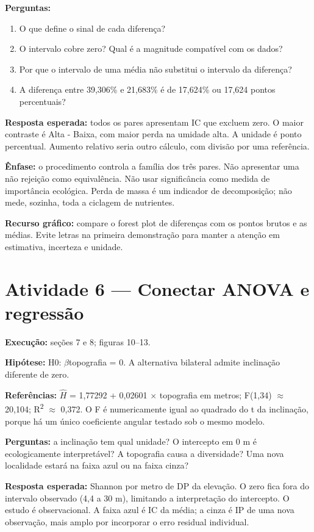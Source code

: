 \textbf{Perguntas:}

\begin{enumerate}
\item O que define o sinal de cada diferença?
\item O intervalo cobre zero? Qual é a magnitude compatível com os dados?
\item Por que o intervalo de uma média não substitui o intervalo da diferença?
\item A diferença entre 39,306\% e 21,683\% é de 17,624\% ou 17,624 pontos percentuais?
\end{enumerate}

\textbf{Resposta esperada:} todos os pares apresentam IC que excluem zero. O maior contraste é Alta - Baixa, com maior perda na umidade alta. A unidade é ponto percentual. Aumento relativo seria outro cálculo, com divisão por uma referência.

\textbf{Ênfase:} o procedimento controla a família dos três pares. Não apresentar uma não rejeição como equivalência. Não usar significância como medida de importância ecológica. Perda de massa é um indicador de decomposição; não mede, sozinha, toda a ciclagem de nutrientes.

\textbf{Recurso gráfico:} compare o forest plot de diferenças com os pontos brutos e as médias. Evite letras na primeira demonstração para manter a atenção em estimativa, incerteza e unidade.

\section{Atividade 6 --- Conectar ANOVA e regressão}

\textbf{Execução:} seções 7 e 8; figuras 10--13.

\textbf{Hipótese:} H0: \ensuremath{\beta}topografia = 0. A alternativa bilateral admite inclinação diferente de zero.

\textbf{Referências:} \ensuremath{\widehat H} = 1,77292 + 0,02601 \ensuremath{\times} topografia em metros; F(1,34) \ensuremath{\approx} 20,104; R\textsuperscript{2} \ensuremath{\approx} 0,372. O F é numericamente igual ao quadrado do t da inclinação, porque há um único coeficiente angular testado sob o mesmo modelo.

\textbf{Perguntas:} a inclinação tem qual unidade? O intercepto em 0 m é ecologicamente interpretável? A topografia causa a diversidade? Uma nova localidade estará na faixa azul ou na faixa cinza?

\textbf{Resposta esperada:} Shannon por metro de DP da elevação. O zero fica fora do intervalo observado (4,4 a 30 m), limitando a interpretação do intercepto. O estudo é observacional. A faixa azul é IC da média; a cinza é IP de uma nova observação, mais amplo por incorporar o erro residual individual.

